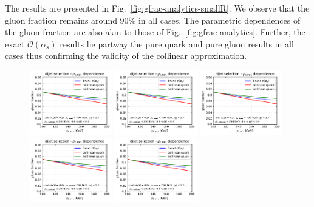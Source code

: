 \documentclass[a4paper,11pt]{article}
\begin{document}
The results are presented in Fig.~\ref{fig:gfrac-analytics-smallR}. We observe that the gluon fraction remains around 90\% in all cases. The parametric dependences of the gluon fraction are also akin to those of Fig.~\ref{fig:gfrac-analytics}. Further, the exact $\mathcal{O}(\alpha_s)$ results lie partway the pure quark and pure gluon results in all cases thus confirming the validity of the collinear approximation.     


\begin{figure}
    \centering
  \includegraphics[page=4,width=0.32\textwidth]{born-fractions-smallr.pdf}
 \includegraphics[page=5,width=0.32\textwidth]{born-fractions-smallr.pdf}
 \includegraphics[page=6,width=0.32\textwidth]{born-fractions-smallr.pdf} \\
     \includegraphics[page=1,width=0.32\textwidth]{born-fractions-smallr.pdf}
   \includegraphics[page=2, width=0.32\textwidth]{born-fractions-smallr.pdf}

\end{figure}
\end{document}
